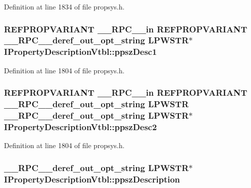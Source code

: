 Definition at line 1834 of file propsys.\+h.

\subsubsection[{\texorpdfstring{ppsz\+Desc1}{ppszDesc1}}]{ {\bf R\+E\+F\+P\+R\+O\+P\+V\+A\+R\+I\+A\+NT} {\bf \+\_\+\+\_\+\+R\+P\+C\+\_\+\+\_\+in} {\bf R\+E\+F\+P\+R\+O\+P\+V\+A\+R\+I\+A\+NT} {\bf \+\_\+\+\_\+\+R\+P\+C\+\_\+\+\_\+deref\+\_\+out\+\_\+opt\+\_\+string} {\bf L\+P\+W\+S\+TR}$\ast$ I\+Property\+Description\+Vtbl\+::ppsz\+Desc1}\hypertarget{struct_i_property_description_vtbl_a463de66422cdf37b745618918e572580}{}\label{struct_i_property_description_vtbl_a463de66422cdf37b745618918e572580}


Definition at line 1804 of file propsys.\+h.

\subsubsection[{\texorpdfstring{ppsz\+Desc2}{ppszDesc2}}]{ {\bf R\+E\+F\+P\+R\+O\+P\+V\+A\+R\+I\+A\+NT} {\bf \+\_\+\+\_\+\+R\+P\+C\+\_\+\+\_\+in} {\bf R\+E\+F\+P\+R\+O\+P\+V\+A\+R\+I\+A\+NT} {\bf \+\_\+\+\_\+\+R\+P\+C\+\_\+\+\_\+deref\+\_\+out\+\_\+opt\+\_\+string} {\bf L\+P\+W\+S\+TR} {\bf \+\_\+\+\_\+\+R\+P\+C\+\_\+\+\_\+deref\+\_\+out\+\_\+opt\+\_\+string} {\bf L\+P\+W\+S\+TR}$\ast$ I\+Property\+Description\+Vtbl\+::ppsz\+Desc2}\hypertarget{struct_i_property_description_vtbl_ab6ca73492f4c8a6f8c2c0dad2ed86add}{}\label{struct_i_property_description_vtbl_ab6ca73492f4c8a6f8c2c0dad2ed86add}


Definition at line 1804 of file propsys.\+h.

\subsubsection[{\texorpdfstring{ppsz\+Description}{ppszDescription}}]{ {\bf \+\_\+\+\_\+\+R\+P\+C\+\_\+\+\_\+deref\+\_\+out\+\_\+opt\+\_\+string} {\bf L\+P\+W\+S\+TR}$\ast$ I\+Property\+Description\+Vtbl\+::ppsz\+Description}\hypertarget{struct_i_property_description_vtbl_afd076ba7f4f88a0d88217032dbcfdcfc}{}\label{struct_i_property_description_vtbl_afd076ba7f4f88a0d88217032dbcfdcfc}


